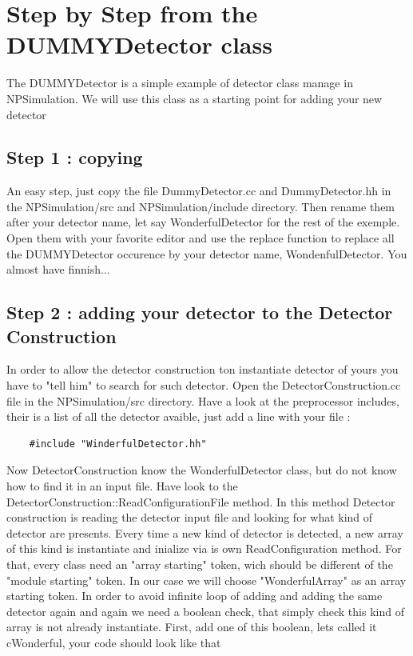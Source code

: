 \documentclass{book}
\begin{document}
\section{ Step by Step from the DUMMYDetector class}
	The DUMMYDetector is a simple example of detector class manage in NPSimulation. 
	We will use this class as a starting point for adding your new detector

	\subsection{Step 1 : copying}
		An easy step, just copy the file DummyDetector.cc and DummyDetector.hh in the NPSimulation/src and NPSimulation/include directory. 
		Then rename them after your detector name, let say WonderfulDetector for the rest of the exemple. 
		Open them with your favorite editor and use the replace function to replace all the DUMMYDetector occurence by your detector name, WondenfulDetector. 
		You almost have finnish...

	\subsection{Step 2 : adding your detector to the Detector Construction}
		In order to allow the detector construction ton instantiate detector of yours you have to "tell him" to search for such detector. 
		Open the DetectorConstruction.cc file in the NPSimulation/src directory. 
		Have a look at the preprocessor includes, their is a list of all the detector avaible, just add a line with your file :
	\begin{verbatim}
	#include "WinderfulDetector.hh"
	\end{verbatim}

		Now DetectorConstruction know the WonderfulDetector class, but do not know how to find it in an input file. 
		Have look to the DetectorConstruction::ReadConfigurationFile method. 
		In this method Detector construction is reading the detector input file and looking for what kind of detector are presents. 
		Every time a new kind of detector is detected, a new array of this kind is instantiate and inialize via is own ReadConfiguration method. 
		For that, every class need an "array starting" token, wich should be different of the "module starting" token. 
		In our case we will choose "WonderfulArray" as an array starting token. 
		In order to avoid infinite loop of adding and adding the same detector again and again we need a boolean check, that simply check this kind of array is not already instantiate. 
		First, add one of this boolean, lets called it cWonderful, your code should look like that
\end{document}

